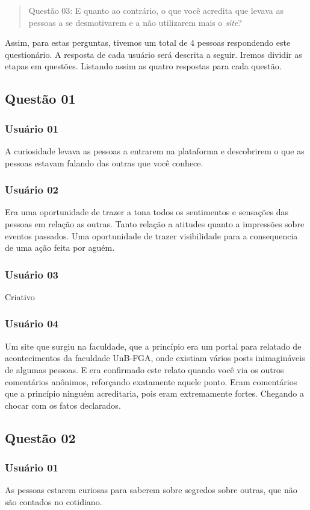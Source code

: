 \begin{quotation}
    Questão 03: E quanto ao contrário, o que você acredita que levava as pessoas a se desmotivarem e a não
    utilizarem mais o \textit{site}?
\end{quotation}

Assim, para estas perguntas, tivemos um total de 4 pessoas respondendo este questionário. A resposta de cada
usuário será descrita a seguir. Iremos dividir as etapas em questões. Listando assim as quatro respostas
para cada questão.


\subsection{Questão 01}
\subsubsection{Usuário 01}
A curiosidade levava as pessoas a entrarem na plataforma e descobrirem o que as
pessoas estavam falando das outras que você conhece.
\subsubsection{Usuário 02}
Era uma oportunidade de trazer a tona todos os sentimentos e sensações das pessoas
em relação as outras. Tanto relação a atitudes quanto a impressões sobre eventos
passados. Uma oportunidade de trazer visibilidade para a consequencia de uma ação
feita por aguém.
\subsubsection{Usuário 03}
Criativo
\subsubsection{Usuário 04}
Um site que surgiu na faculdade, que a princípio era um portal para relatado de
acontecimentos da faculdade UnB-FGA, onde existiam vários posts inimagináveis
de algumas pessoas. E era confirmado este relato quando você via os outros comentários
anônimos, reforçando exatamente aquele ponto. Eram comentários que a princípio ninguém
acreditaria, pois eram extremamente fortes. Chegando a chocar com os fatos
declarados.

\subsection{Questão 02}
\subsubsection{Usuário 01}
As pessoas estarem curiosas para saberem sobre segredos sobre outras, que não
são contados no cotidiano.
